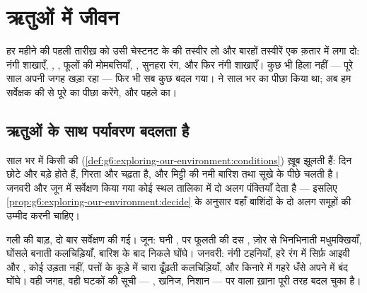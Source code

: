 \chapter{ऋतुओं में जीवन}\label{ch:g6:life-through-seasons}

हर महीने की पहली तारीख़ को उसी चेस्टनट के  की तस्वीर लो और बारहों
तस्वीरें एक क़तार में लगा दो: नंगी शाखाएँ, , , फूलों की
मोमबत्तियाँ, , सुनहरा रंग, और फिर नंगी शाखाएँ। कुछ भी हिला नहीं ---
 पूरे साल अपनी जगह खड़ा रहा --- फिर भी सब कुछ बदल गया।
 ने साल भर  का पीछा किया था;
अब हम सर्वेक्षक की  से पूरे  का पीछा करेंगे, और पहले
 का।

\section{ऋतुओं के साथ पर्यावरण बदलता है}

\begin{proposition}[परिस्थितियों का ऋतु-बदलाव]\label{prop:g6:life-through-seasons:conditions}
साल भर में किसी  की 
(\cref{def:g6:exploring-our-environment:conditions}) ख़ूब झूलती हैं:
दिन छोटे और बड़े होते हैं,  गिरता और चढ़ता है, और मिट्टी की नमी
बारिश तथा सूखे के पीछे चलती है। जनवरी और जून में सर्वेक्षण किया गया कोई
स्थल तालिका में दो अलग पंक्तियाँ देता है --- इसलिए
\cref{prop:g6:exploring-our-environment:decide} के अनुसार वहाँ बाशिंदों
के दो अलग समूहों की उम्मीद करनी चाहिए।
\end{proposition}
\admitted

\begin{example}[एक बाड़, दो सर्वेक्षण]\label{ex:g6:life-through-seasons:hedge}
गली की बाड़, दो बार सर्वेक्षण की गई। जून: घनी ,  पर फूलती
 की दस , ज़ोर से भिनभिनाती मधुमक्खियाँ, घोंसले बनाती
कलचिड़ियाँ, बारिश के बाद निकले घोंघे। जनवरी: नंगी टहनियाँ, हरे रंग में
सिर्फ़ आइवी और , कोई उड़ता  नहीं, पत्तों के कूड़े में चारा ढूँढ़ती
कलचिड़ियाँ, और किनारे में गहरे धँसे अपने  में बंद घोंघे। वही जगह,
वही घटकों की सूची --- , खनिज, निशान --- पर  वाला ख़ाना पूरी तरह
बदल चुका है।
\end{example}

